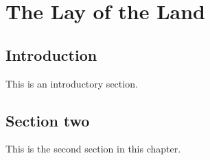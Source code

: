 \chapter{The Lay of the Land}
\label{ch:over}


\section{Introduction}
\label{over:s:intro}

This is an introductory section.

\section{Section two}

This is the second section in this chapter.
